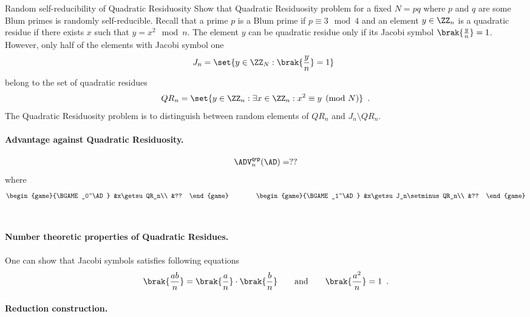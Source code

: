 \documentclass{crypto-exercise}
\author{Sven Laur}
\begin{document}
\begin{exercise}{Random self-reducibility of Quadratic Residuosity}
Show that Quadratic Residuosity problem for a fixed $N=pq$ where $p$ and $q$ are  
some Blum primes is randomly self-reducible.
Recall that a prime $p$ is a Blum prime if $p\equiv 3\mod 4$ and an element $y\in\ZZ_n$ is a quadratic residue if there exists $x$ such that $y=x^2\mod n$. 
The element $y$ can be quadratic residue only if its Jacobi symbol $\brak{\frac{y}{n}}=1$.
However, only half of the elements with Jacobi symbol one 
\begin{align*}
   J_n=\set{y\in\ZZ_N:\displaystyle{\brak{\frac{y}{n}}=1}}\enspace   
\end{align*}
belong to the set of quadratic residues
\begin{align*}
   QR_n=\set{y\in\ZZ_n:\exists x\in\ZZ_n: x^2\equiv y \pmod N}\enspace.   
\end{align*}
The Quadratic Residuosity problem is to distinguish between random elements of $QR_n$ and $J_n\setminus QR_n$.
\end{exercise}

\begin{solution}
\paragraph{Advantage against Quadratic Residuosity.}

\begin{align*}
\advQRPXX{n}{\AD}= ??
\end{align*}
where
\begin{align*}
    \begin{game}{\BGAME_0^\AD}
      &x\getsu QR_n\\
      &??
    \end{game}
    \qquad\qquad
       \begin{game}{\BGAME_1^\AD}
      &x\getsu J_n\setminus QR_n\\
      &??
    \end{game}
\end{align*}
\ \\

\paragraph{Number theoretic properties of Quadratic Residues.}
One can show that Jacobi symbols satisfies following equations
\begin{align*}
    \brak{\frac{ab}{n}}=\brak{\frac{a}{n}}\cdot\brak{\frac{b}{n}}
    \qquad\text{and}\qquad
    \brak{\frac{a^2}{n}}=1\enspace.
\end{align*}



\paragraph{Reduction construction.}

\end{solution}
\end{document}
